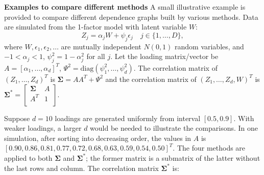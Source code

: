 \documentclass[a4paper]{article}
\def\diag{\text{diag}}
\def\sigb{{\boldsymbol{\Sigma}}}
\begin{document}
\textbf{Examples to compare different methods}
A small illustrative example is provided to compare different dependence graphs built by various methods. Data are simulated from the
1-factor model with latent variable $W$:
\begin{equation}
    Z_{j}=\alpha_{j}W+\psi_{j}\epsilon_{j}\quad 
  j\in\{1,\ldots,D\},
  \label{eq-1factor-gauss}
\end{equation}  
where $W,\epsilon_1,\epsilon_2,\ldots$ are mutually independent $N(0,1)$
random variables, and $-1<\alpha_j<1$, $\psi_j^2=1-\alpha_j^2$
for all $j$. Let the loading matrix/vector be $A=[\alpha_{1},\ldots,\alpha_{d}]^{T}$, $\Psi^{2}=\diag(\psi_1^2,\ldots,\psi_{d}^{2})$. The correlation matrix of $(Z_1,\ldots,Z_{d})^{T}$ is $\sigb=AA^{T}+\Psi^{2}$ and the correlation matrix of $(Z_1,\ldots,Z_{d},W)^{T}$ is $\sigb^{*}=\begin{bmatrix}
\sigb &  A\\
A^{T} & 1\\
\end{bmatrix}.$ 

Suppose $d=10$ loadings are generated uniformly from interval $[0.5,0.9]$.
With weaker loadings, a  larger $d$ would be needed to illustrate
the comparisons.
In one simulation, after sorting into decreasing order,
the values in $A$ is $[0.90, 0.86, 0.81, 0.77, 0.72, 0.68, 0.63, 0.59, 0.54, 0.50]^{T}$. 
The four methods are applied to both $\sigb$ and $\sigb^{*}$; the former
matrix is a submatrix of the latter without the last rows and column. The correlation matrix $\sigb^{*}$ is:
\end{document}
